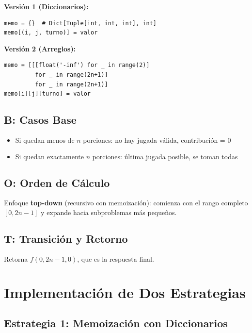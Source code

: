 \documentclass[12pt,letterpaper]{article}
\begin{document}
\textbf{Versión 1 (Diccionarios):}
\begin{lstlisting}
memo = {}  # Dict[Tuple[int, int, int], int]
memo[(i, j, turno)] = valor
\end{lstlisting}

\textbf{Versión 2 (Arreglos):}
\begin{lstlisting}
memo = [[[float('-inf') for _ in range(2)] 
         for _ in range(2n+1)] 
         for _ in range(2n+1)]
memo[i][j][turno] = valor
\end{lstlisting}

\subsection{B: Casos Base}

\begin{itemize}
    \item Si quedan menos de $n$ porciones: no hay jugada válida, contribución = 0
    \item Si quedan exactamente $n$ porciones: última jugada posible, se toman todas
\end{itemize}

\subsection{O: Orden de Cálculo}

Enfoque \textbf{top-down} (recursivo con memoización): comienza con el rango completo $[0, 2n-1]$ y expande hacia subproblemas más pequeños.

\subsection{T: Transición y Retorno}

Retorna $f(0, 2n-1, 0)$, que es la respuesta final.

\section{Implementación de Dos Estrategias}

\subsection{Estrategia 1: Memoización con Diccionarios}
\end{document}
